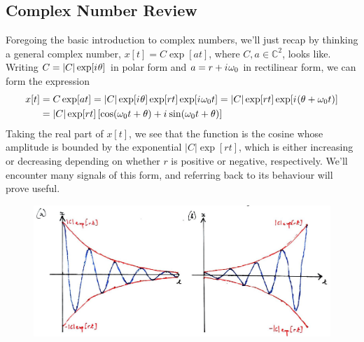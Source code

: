 \subsection{Complex Number Review}
%
Foregoing the basic introduction to complex numbers, we'll just recap by thinking a general complex
number, $x[t] = C\exp[at]$, where $C,a\in \mathbb{C}^2$, looks like. Writing $C = |C|\exp[{i\mkern1mu}\theta]$ in
polar form and $a = r + {i\mkern1mu}\omega_0$ in rectilinear form, we can form the expression
%
\begin{align*}
  x[t] &= C\exp[at] = |C|\exp[{i\mkern1mu}\theta]\exp[rt]\exp[{i\mkern1mu}\omega_0 t] = |C|\exp[rt]\exp[{i\mkern1mu}(\theta + \omega_0 t)] \\
  &= |C|\exp[rt]\left[ \cos(\omega_0 t + \theta) + {i\mkern1mu}\sin(\omega_0 t + \theta) \right]
\end{align*}
%
Taking the real part of $x[t]$, we see that the function is the cosine whose amplitude is bounded by the
exponential $|C|\exp[rt]$, which is either increasing or decreasing depending on whether $r$ is positive
or negative, respectively. We'll encounter many signals of this form, and referring back to its behaviour
will prove useful.
%
\begin{figure}[!htb]
  \includegraphics[width=\textwidth]{images/lecture_1_complex_numbers.JPG}
  \caption{
  }
  \label{fig::lecture_1_complex_numbers}
\end{figure}

